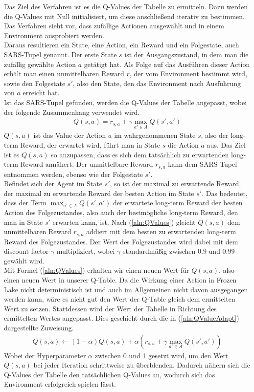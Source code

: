 \documentclass[11pt]{scrartcl}
\begin{document}
\noindent
Das Ziel des Verfahren ist es die Q-Values der Tabelle zu ermitteln. Dazu werden die
Q-Values mit Null initialisiert, um diese anschließend iterativ zu bestimmen. Das Verfahren 
sieht vor, dass zufällige Actionen ausgewählt und in einem Environment ausprobiert werden.\\
Daraus resultieren ein State, eine Action, ein Reward und ein Folgestate, auch SARS-Tupel
genannt. Der erste State $s$ ist der Ausgangszustand, in dem man die zufällig gewählte
Action $a$ getätigt hat. Als Folge auf das Ausführen dieser Action erhält man einen
unmittelbaren Reward $r$, der vom Environment bestimmt wird, sowie den Folgestate $s'$,
also den State, den das Environment nach Ausführung von $a$ erreicht hat.\\
Ist das SARS-Tupel gefunden, werden die Q-Values der Tabelle angepasst, wobei der folgende
Zusammenhang verwendet wird.
\begin{align}
Q(s, a) = r_{s,a} + \gamma \max_{a' \in A}Q(s', a')
\label{aln:QValues}
\end{align}
\noindent
$Q(s, a)$ ist das Value der Action $a$ im wahrgenommenen State $s$, also der long-term
Reward, der erwartet wird, führt man in State $s$ die Action $a$ aus. Das Ziel ist es
$Q(s, a)$ so anzupassen, dass es sich dem tatsächlich zu erwartenden long-term Reward
annähert. Der unmittelbare Reward $r_{s,a}$ kann dem SARS-Tupel entnommen werden, ebenso
wie der Folgestate $s'$.\\
Befindet sich der Agent im State $s'$, so ist der maximal zu erwartende Reward, der 
maximal zu erwartende Reward der besten Action im State $s'$. Das bedeutet, dass
der Term $\max_{a'\in A} Q(s', a')$ der erwartete long-term Reward der besten Action des
Folgezustandes, also auch der bestmögliche long-term Reward, den man in State $s'$
erwarten kann, ist. Nach (\ref{aln:QValues}) gleicht $Q(s, a)$ dem unmittelbaren Reward
$r_{s,a}$ addiert mit dem besten zu erwartenden long-term Reward des Folgezustandes. Der
Wert des Folgezustandes wird dabei mit dem discount factor $\gamma$ multipliziert, wobei 
$\gamma$ standardmäßig zwischen $0.9$ und $0.99$ gewählt wird.\\
Mit Formel (\ref{aln:QValues}) erhalten wir einen neuen Wert für $Q(s, a)$, also einen
neuen Wert in unserer Q-Table. Da die Wirkung einer Action in Frozen Lake nicht
deterministisch ist und auch im Allgemeinen nicht davon ausgegangen werden kann, wäre es
nicht gut den Wert der Q-Table gleich dem ermittelten Wert zu setzen. Stattdessen wird der
Wert der Tabelle in Richtung des ermittelten Wertes angepasst. Dies geschieht durch die in
(\ref{aln:QValueAdapt}) dargestellte Zuweisung.
\begin{align}
  Q(s, a) \leftarrow (1 - \alpha)Q(s, a) +
  \alpha(r_{s, a} + \gamma \max_{a'\in A}Q(s', a'))
\label{aln:QValueAdapt}
\end{align}
\noindent
Wobei der Hyperparameter $\alpha$ zwischen 0 und 1 gesetzt wird, um den Wert $Q(s, a)$ bei
jeder Iteration schrittweise zu überblenden. Dadurch nähern sich die Q-Values der Tabelle
den tatsächlichen Q-Values an, wodurch sich das Environment erfolgreich spielen lässt.
\end{document}

